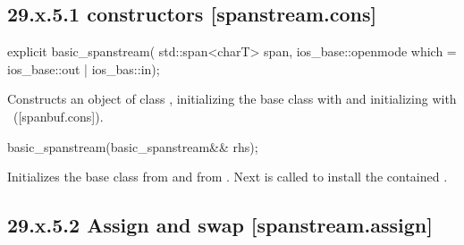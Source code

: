 \documentclass[ebook,11pt,article]{memoir}
\renewcommand{\iref}[1]{[#1]}
\begin{document}

\subsection{29.x.5.1  constructors [spanstream.cons]}
\label{spanstream.cons}

\begin{itemdecl}
explicit basic_spanstream(
  std::span<charT> span,
  ios_base::openmode which = ios_base::out | ios_bas::in);
\end{itemdecl}

\begin{itemdescr}
\pnum
\effects
Constructs an object of class
,
initializing the base class with
and initializing  with
~(\iref{spanbuf.cons}).
\end{itemdescr}

\begin{itemdecl}
basic_spanstream(basic_spanstream&& rhs);
\end{itemdecl}

\begin{itemdescr}
\pnum
\effects Initializes the base class from  
and  from .
Next  is called to
install the contained .
\end{itemdescr}

\subsection{29.x.5.2 Assign and swap [spanstream.assign]}
\label{spanstream.assign}
\end{document}
